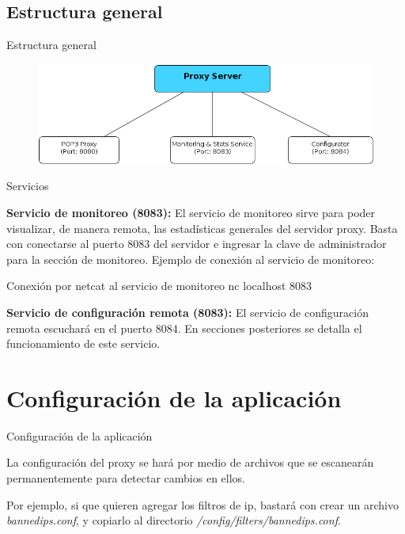 \documentclass{beamer}
\begin{document}
\subsection{Estructura general}
\begin{frame}{Estructura general}
\begin{figure}[H]
\begin{center}
\includegraphics[scale=0.40]{./images/Servers.png}
\label{modelado}
\end{center}
\end{figure}
\end{frame}

\begin{frame}{Servicios}

\par \textbf{Servicio de monitoreo (8083):} El servicio de monitoreo sirve para poder visualizar, de manera remota, las estadísticas generales del servidor proxy. Basta con conectarse al puerto 8083 del servidor e ingresar la clave de administrador para la sección de monitoreo. Ejemplo de conexión al servicio de monitoreo:

\begin{block}{Conexión por netcat al servicio de monitoreo}
nc localhost 8083
\end{block}

\par \textbf{Servicio de configuración remota (8083):} El servicio de configuración remota escuchará en el puerto 8084. En secciones posteriores se detalla el funcionamiento de este servicio.

\end{frame}

\section{Configuración de la aplicación}
\begin{frame}{Configuración de la aplicación}

\par La configuración del proxy se hará por medio de archivos que se escanearán permanentemente para detectar cambios en ellos.\\[1cm]
\par Por ejemplo, si que quieren agregar los filtros de ip, bastará con crear un archivo \textit{bannedips.conf}, y copiarlo al directorio \textit{/config/filters/bannedips.conf}.

\end{frame}
\end{document}
